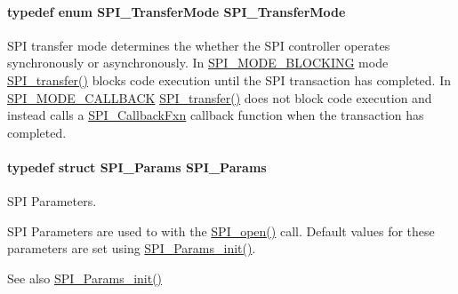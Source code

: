 \paragraph[{S\+P\+I\+\_\+\+Transfer\+Mode}]{\setlength{\rightskip}{0pt plus 5cm}typedef enum {\bf S\+P\+I\+\_\+\+Transfer\+Mode}  {\bf S\+P\+I\+\_\+\+Transfer\+Mode}}\label{_s_p_i_8h_a03fe641fa0950b2fe6c1b596cc5c235b}


S\+P\+I transfer mode determines the whether the S\+P\+I controller operates synchronously or asynchronously. In \hyperlink{_s_p_i_8h_ab9ea76c6529d6076eee5e1c4a5a92c6fa0dfb2358e008316426895e7237c398e8}{S\+P\+I\+\_\+\+M\+O\+D\+E\+\_\+\+B\+L\+O\+C\+K\+I\+N\+G} mode \hyperlink{_s_p_i_8h_a989e17f96b54fcc3dc2cac5f8ac6bdb2}{S\+P\+I\+\_\+transfer()} blocks code execution until the S\+P\+I transaction has completed. In \hyperlink{_s_p_i_8h_ab9ea76c6529d6076eee5e1c4a5a92c6fa5631e69925c47a62a261c78ebbda39fb}{S\+P\+I\+\_\+\+M\+O\+D\+E\+\_\+\+C\+A\+L\+L\+B\+A\+C\+K} \hyperlink{_s_p_i_8h_a989e17f96b54fcc3dc2cac5f8ac6bdb2}{S\+P\+I\+\_\+transfer()} does not block code execution and instead calls a \hyperlink{_s_p_i_8h_a207e2d5a7e7ea5606b6995b6485ca015}{S\+P\+I\+\_\+\+Callback\+Fxn} callback function when the transaction has completed. 

\paragraph[{S\+P\+I\+\_\+\+Params}]{\setlength{\rightskip}{0pt plus 5cm}typedef struct {\bf S\+P\+I\+\_\+\+Params}  {\bf S\+P\+I\+\_\+\+Params}}\label{_s_p_i_8h_ae69b175346a856bdbb4ee6ed46b59a2f}


S\+P\+I Parameters. 

S\+P\+I Parameters are used to with the \hyperlink{_s_p_i_8h_a62cfe494cb1df47cd602e8747e894fd1}{S\+P\+I\+\_\+open()} call. Default values for these parameters are set using \hyperlink{_s_p_i_8h_a9c3dd1748332fd6e31c79a6538a71642}{S\+P\+I\+\_\+\+Params\+\_\+init()}.

\begin{DoxySeeAlso}{See also}
\hyperlink{_s_p_i_8h_a9c3dd1748332fd6e31c79a6538a71642}{S\+P\+I\+\_\+\+Params\+\_\+init()} 
\end{DoxySeeAlso}
